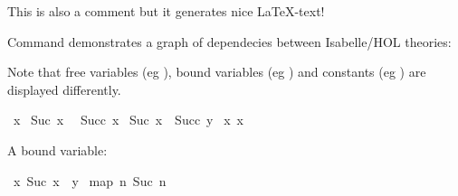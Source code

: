 %
\begin{isabellebody}%
%
%
\isadelimdocument
%
\endisadelimdocument
%
\isatagdocument
%
\isamarkuptrue%
%
\endisatagdocument
{\isafolddocument}%
%
\isadelimdocument
%
\endisadelimdocument
%
\isadelimtheory
%
\endisadelimtheory
%
\isatagtheory
%
\endisatagtheory
{\isafoldtheory}%
%
\isadelimtheory
%
\endisadelimtheory
%
\begin{isamarkuptext}%
This is also a comment but it generates nice \LaTeX-text!%
\end{isamarkuptext}\isamarkuptrue%
%
\begin{isamarkuptext}%
Command  demonstrates a graph of dependecies between Isabelle/HOL theories:%
\end{isamarkuptext}\isamarkuptrue%
%
\isadelimdocument
%
\endisadelimdocument
%
\isatagdocument
%
\isamarkuptrue%
%
\endisatagdocument
{\isafolddocument}%
%
\isadelimdocument
%
\endisadelimdocument
%
\begin{isamarkuptext}%
Note that free variables (eg ), 
 bound variables (eg ) and
 constants (eg ) are displayed differently.%
\end{isamarkuptext}\isamarkuptrue%
\isamarkupfalse%
\ {\isachardoublequoteopen}x{\isachardoublequoteclose}\isanewline
{}\isamarkupfalse%
\ {\isachardoublequoteopen}Suc\ x{\isachardoublequoteclose}\ \isanewline
{}\isamarkupfalse%
\ {\isachardoublequoteopen}Succ\ x{\isachardoublequoteclose}\isanewline
{}\isamarkupfalse%
\ {\isachardoublequoteopen}Suc\ x\ {\isacharequal}{\kern0pt}\ Succ\ y{\isachardoublequoteclose}\isanewline
{}\isamarkupfalse%
\ {\isachardoublequoteopen}{\isasymlambda}x{\isachardot}{\kern0pt}\ x{\isachardoublequoteclose}%
\begin{isamarkuptext}%
A bound variable:%
\end{isamarkuptext}\isamarkuptrue%
\isamarkupfalse%
\ {\isachardoublequoteopen}{\isasymlambda}x{\isachardot}{\kern0pt}\ Suc\ x\ {\isacharless}{\kern0pt}\ y{\isachardoublequoteclose}\isanewline
{}\isamarkupfalse%
\ {\isachardoublequoteopen}map\ {\isacharparenleft}{\kern0pt}{\isasymlambda}n{\isachardot}{\kern0pt}\ Suc\ n\ {\isacharplus}{\kern0pt}\ {}{\isacharparenright}{\kern0pt}\ {\isacharbrackleft}{\kern0pt}{}{\isacharcomma}{\kern0pt}\ {}{\isacharbrackright}{\kern0pt}\ {\isacharequal}{\kern0pt}\ {\isacharbrackleft}{\kern0pt}{}{\isacharcomma}{\kern0pt}\ {}{\isacharbrackright}{\kern0pt}{\isachardoublequoteclose}%

\end{isabellebody}
